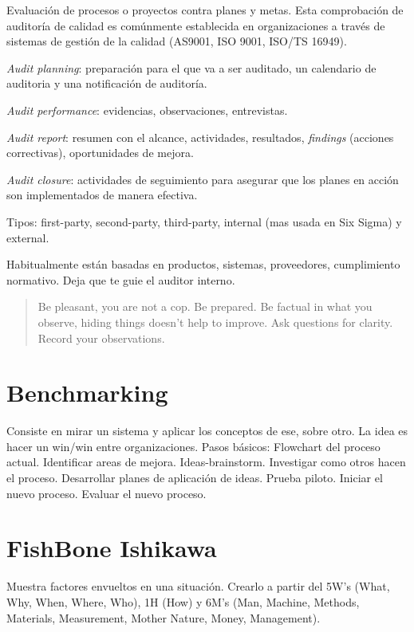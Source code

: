 \documentclass[oneside]{book}
\begin{document}
Evaluación de procesos o proyectos contra planes y metas. Esta comprobación de auditoría de calidad es comúnmente establecida en organizaciones a través de sistemas de gestión de la calidad (AS9001, ISO 9001, ISO/TS 16949).

\textit{Audit planning}: preparación para el que va a ser auditado, un calendario de auditoria y una notificación de auditoría.

\textit{Audit performance}: evidencias, observaciones, entrevistas.

\textit{Audit report}: resumen con el alcance, actividades, resultados, \textit{findings} (acciones correctivas), oportunidades de mejora.

\textit{Audit closure}: actividades de seguimiento para asegurar que los planes en acción son implementados de manera efectiva.

Tipos: first-party, second-party, third-party, internal (mas usada en Six Sigma) y external.

Habitualmente están basadas en productos, sistemas, proveedores, cumplimiento normativo. Deja que te guie el auditor interno.

\begin{quote}
Be pleasant, you are not a cop. Be prepared. Be factual in what you observe, hiding things doesn't help to improve. Ask questions for clarity. Record your observations. 
\end{quote}

\section{Benchmarking}

Consiste en mirar un sistema y aplicar los conceptos de ese, sobre otro. La idea es hacer un win/win entre organizaciones. Pasos básicos: Flowchart del proceso actual. Identificar areas de mejora. Ideas-brainstorm. Investigar como otros hacen el proceso. Desarrollar planes de aplicación de ideas. Prueba piloto. Iniciar el nuevo proceso. Evaluar el nuevo proceso.

\section{FishBone Ishikawa}

Muestra factores envueltos en una situación. Crearlo a partir del 5W's (What, Why, When, Where, Who), 1H (How) y 6M's (Man, Machine, Methods, Materials, Measurement, Mother Nature, Money, Management).
\end{document}
